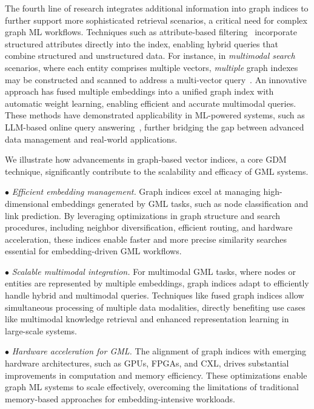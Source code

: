 \documentclass{sig-alternate-10pt}
\newcommand{\spara}[1]{\smallskip\noindent{\bf #1}}
\begin{document}
The fourth line of research integrates additional information into graph indices to further support more sophisticated retrieval scenarios, a critical need for complex graph ML workflows.
Techniques such as attribute-based filtering~\cite{wang2023efficient, gollapudi2023filtered, PKGZ24ACORN, ZQZLD4SERF} incorporate structured attributes directly into the index, enabling hybrid queries that combine structured and unstructured data.
For instance, in {\em multimodal search} scenarios, where each entity comprises multiple vectors, {\em multiple} graph indexes may be constructed and scanned to address a multi-vector query~\cite{wang2021milvus,zhang2023vbase}.
An innovative approach \cite{WKXCGHZ24} has fused multiple embeddings into a unified graph index with automatic weight learning, enabling efficient and accurate multimodal queries.
These methods have demonstrated applicability in ML-powered systems, such as LLM-based online query answering~\cite{WWKGXC24}, further bridging the gap between advanced data management and real-world applications.

\spara{Synergy.}
We illustrate how advancements in graph-based vector indices, a core GDM technique, significantly contribute to the scalability and efficacy of GML systems.

\noindent $\bullet$ {\em Efficient embedding management.}
Graph indices excel at managing high-dimensional embeddings generated by GML tasks, such as node classification and link prediction. By leveraging optimizations in graph structure and search procedures, including neighbor diversification, efficient routing, and hardware acceleration, these indices enable faster and more precise similarity searches essential for embedding-driven GML workflows.

\noindent $\bullet$ {\em Scalable multimodal integration.}
For multimodal GML tasks, where nodes or entities are represented by multiple embeddings, graph indices adapt to efficiently handle hybrid and multimodal queries. Techniques like fused graph indices allow simultaneous processing of multiple data modalities, directly benefiting use cases like multimodal knowledge retrieval and enhanced representation learning in large-scale systems.

\noindent $\bullet$ {\em Hardware acceleration for GML.}
The alignment of graph indices with emerging hardware architectures, such as GPUs, FPGAs, and CXL, drives substantial improvements in computation and memory efficiency. These optimizations enable graph ML systems to scale effectively, overcoming the limitations of traditional memory-based approaches for embedding-intensive workloads.
\end{document}
